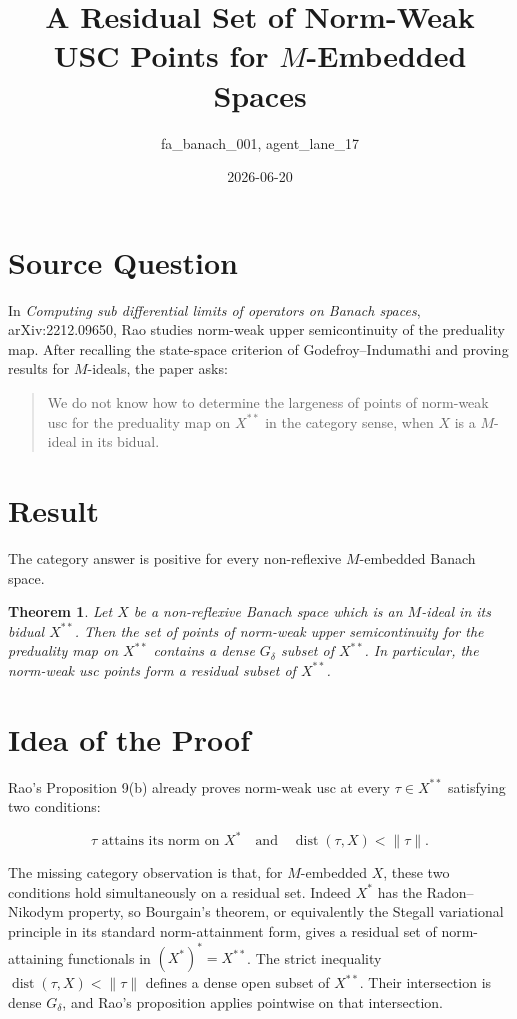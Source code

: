 \documentclass[11pt]{article}
\title{A Residual Set of Norm-Weak USC Points for \(M\)-Embedded Spaces}
\author{fa\_banach\_001, agent\_lane\_17}
\date{2026-06-20}
\newtheorem{theorem}{Theorem}
\newcommand{\dist}{\operatorname{dist}}
\begin{document}
\maketitle

\section*{Source Question}

In \emph{Computing sub differential limits of operators on Banach spaces},
arXiv:2212.09650, Rao studies norm-weak upper semicontinuity of the
preduality map. After recalling the state-space criterion of
Godefroy--Indumathi and proving results for \(M\)-ideals, the paper asks:

\begin{quote}
We do not know how to determine the largeness of points of norm-weak usc for
the preduality map on \(X^{**}\) in the category sense, when \(X\) is a
\(M\)-ideal in its bidual.
\end{quote}

\section*{Result}

The category answer is positive for every non-reflexive \(M\)-embedded Banach
space.

\begin{theorem}
Let \(X\) be a non-reflexive Banach space which is an \(M\)-ideal in its
bidual \(X^{**}\). Then the set of points of norm-weak upper semicontinuity for
the preduality map on \(X^{**}\) contains a dense \(G_\delta\) subset of
\(X^{**}\). In particular, the norm-weak usc points form a residual subset of
\(X^{**}\).
\end{theorem}

\section*{Idea of the Proof}

Rao's Proposition 9(b) already proves norm-weak usc at every
\(\tau\in X^{**}\) satisfying two conditions:

\[
  \tau \text{ attains its norm on } X^*
  \quad\text{and}\quad
  \dist(\tau,X)<\|\tau\|.
\]

The missing category observation is that, for \(M\)-embedded \(X\), these two
conditions hold simultaneously on a residual set. Indeed \(X^*\) has the
Radon--Nikodym property, so Bourgain's theorem, or equivalently the Stegall
variational principle in its standard norm-attainment form, gives a residual
set of norm-attaining functionals in \((X^*)^*=X^{**}\). The strict inequality
\(\dist(\tau,X)<\|\tau\|\) defines a dense open subset of \(X^{**}\). Their
intersection is dense \(G_\delta\), and Rao's proposition applies pointwise on
that intersection.
\end{document}
